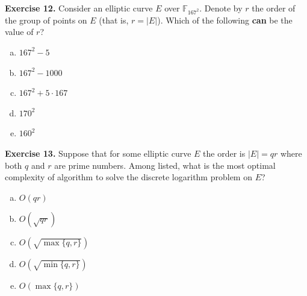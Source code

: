 \documentclass[../lecture-notes-148x210.tex]{subfiles}
\begin{document}
\textbf{Exercise 12.} Consider an elliptic curve $E$ over $\mathbb{F}_{167^2}$. Denote by $r$ the order of the group of points on $E$ (that is, $r=|E|$). Which of the following \textbf{can} be the value of $r$?
\begin{multicols}{3}    
    \begin{enumerate}[a)]
        \item $167^2 - 5$
        \item $167^2-1000$
        \item $167^2+5 \cdot 167$
        \item $170^2$
        \item $160^2$
    \end{enumerate}
\end{multicols}

\textbf{Exercise 13.} Suppose that for some elliptic curve $E$ the order is $|E| = qr$ where both $q$ and $r$ are prime numbers. Among listed, what is the most optimal complexity of algorithm to solve the discrete logarithm problem on $E$?
\begin{multicols}{3}    
    \begin{enumerate}[a)]
        \item $O(qr)$
        \item $O(\sqrt{qr})$
        \item $O(\sqrt{\max\{q,r\}})$
        \item $O(\sqrt{\min\{q,r\}})$
        \item $O(\max\{q,r\})$
    \end{enumerate}
\end{multicols}
\end{document}
